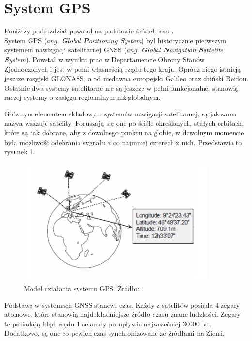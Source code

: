 \section{System GPS}
\label{GPS}

Poniższy podrozdział powstał na podstawie źródeł \cite{GPS_ublox} oraz \cite{inzynierka}.\\



System GPS (\textit{ang. \textbf{G}lobal \textbf{P}ositioning \textbf{S}ystem}) był historycznie pierwszym systemem nawizgacji satelitarnej GNSS (\textit{ang. \textbf{G}lobal \textbf{N}avigation \textbf{S}attelite \textbf{S}ystem}). Powstał w wyniku prac w Departamencie Obrony Stanów Zjednoczonych i jest w pełni własnością rządu tego kraju. Oprócz niego istnieją jeszcze rosyjski GLONASS, a od niedawna europejski Galileo oraz chiński Beidou. Ostatnie dwa systemy satelitarne nie są jeszcze w pełni funkcjonalne, stanowią raczej systemy o zasięgu regionalnym niż globalnym.

Głównym elementem składowym systemów nawigacji satelitarnej, są jak sama nazwa wsazuje satelity. Poruszają się one po ściśle określonych, stałych orbitach, które są tak dobrane, aby z dowolnego punktu na globie, w dowolnym momencie była możliwość odebrania sygnału z co najmniej czterech z nich. Przedstawia to rysunek \ref{fig:image_gps_basics}.

\begin{figure}[H]
	\centering
	\includegraphics[width=10cm]{img/theory/GPS/gps_introduction.png}
	\caption{Model działania systemu GPS. Źródło: \cite{GPS_ublox}.}
	\label{fig:image_gps_basics}
\end{figure}

Podstawę w systemach GNSS stanowi czas. Każdy z satelitów posiada 4 zegary atomowe, które stanowią najdokładniejsze źródło czasu znane ludzkości. Zegary te posiadają błąd rzędu 1 sekundy po upływie najwcześniej 30000 lat. Dodatkowo, są one co pewien czas synchronizowane ze źródłami na Ziemi.

